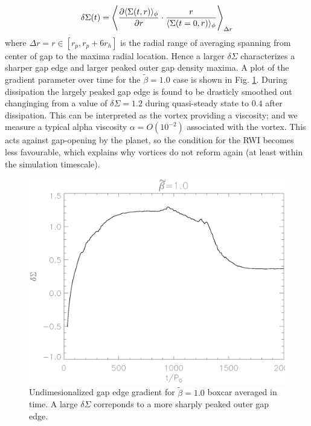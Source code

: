\begin{align}
 \delta\Sigma(t)= \la \frac{\partial \langle \Sigma(t,r) \rangle_{\phi}}{\partial r} \cdot \frac{r}{\langle \Sigma(t=0,r) \rangle_{\phi}} \ra_{\Delta r} 
\end{align}
where $\Delta r = r\in [r_p,r_p + 6r_h]$ is the radial range of averaging spanning
from center of gap to the maxima radial location.
Hence a larger $\delta \Sigma$ characterizes a sharper gap edge and larger
peaked outer gap density maxima. A plot of the gradient parameter over time
for the $\tilde\beta=1.0$ case is shown in Fig. \ref{smoothnessplot}.
During dissipation the largely peaked gap edge is found to be
drasticly smoothed out changinging from a value of $\delta\Sigma=1.2$ during
quasi-steady state to $0.4$ after dissipation.
This can be interpreted as the vortex providing a viscosity;  
and we measure a typical alpha viscosity $\alpha = O(10^{-2})$
associated with the vortex. This acts against gap-opening
by the planet, so the condition for the RWI
becomes less favourable, which explains why vortices do not
reform again (at least within the simulation timescale). 

\begin{figure}
  \includegraphics[width=\linewidth]{figures/gap_smoothness}
  \caption{Undimesionalized gap edge gradient for
    $\tilde\beta=1.0$ boxcar averaged in time. A large $\delta\Sigma$
    correponds to a more sharply peaked outer gap edge.
    \label{smoothnessplot}}  
\end{figure}


